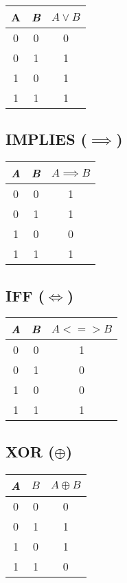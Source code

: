 \begin{multicols}{2}
	\begin{tabular}{ccc}
		\toprule
		\(\)A\(\) & \emph{B} & \(A \lor B\) \\
		\midrule
		0   & 0   & 0          \\
		0   & 1   & 1          \\
		1   & 0   & 1          \\
		1   & 1   & 1          \\
		\bottomrule
	\end{tabular}

	\vspace{1em}

	\subsection*{IMPLIES (\(\implies\))}

	\begin{tabular}{ccc}
		\toprule
		\emph{A} & \emph{B} & \(A \implies B\) \\
		\midrule
		0   & 0   & 1        \\
		0   & 1   & 1        \\
		1   & 0   & 0        \\
		1   & 1   & 1        \\
		\bottomrule
	\end{tabular}

	\columnbreak

	\subsection*{IFF (\(\iff\))}

	\begin{tabular}{ccc}
		\toprule
		\emph{A} & \emph{B} & \(A <=> B\) \\
		\midrule
		0   & 0   & 1         \\
		0   & 1   & 0         \\
		1   & 0   & 0         \\
		1   & 1   & 1         \\
		\bottomrule
	\end{tabular}

	\vspace{1em}

	\subsection*{XOR (\(\oplus\))}

	\begin{tabular}{ccc}
		\toprule
		\emph{A} & $B$ & $A \oplus B$ \\
		\midrule
		0   & 0   & 0            \\
		0   & 1   & 1            \\
		1   & 0   & 1            \\
		1   & 1   & 0            \\
		\bottomrule
	\end{tabular}


\end{multicols}
